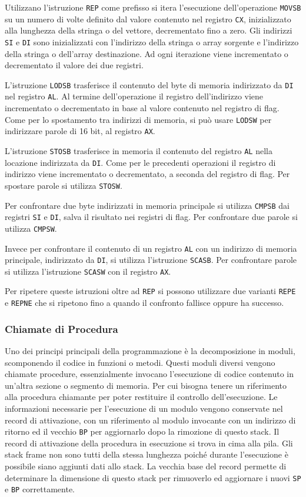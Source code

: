 \documentclass{article}
\numberwithin{equation}{subsection}
\begin{document}
Utilizzano l'istruzione \verb|REP| come prefisso si itera l'esecuzione dell'operazione \verb|MOVSB| su un numero di volte definito dal valore contenuto 
nel registro \verb|CX|, inizializzato alla lunghezza della stringa o del vettore, decrementato fino a zero. Gli indirizzi \verb|SI| e \verb|DI| sono 
inizializzati con l'indirizzo della stringa o array sorgente e l'indirizzo della stringa o dell'array destinazione. Ad ogni iterazione viene incrementato 
o decrementato il valore dei due registri. 


L'istruzione \verb|LODSB| trasferisce il contenuto del byte di memoria indirizzato da \verb|DI| nel registro \verb|AL|. Al termine dell'operazione il 
registro dell'indirizzo viene incrementato o decrementato in base al valore contenuto nel registro di flag. 
Come per lo spostamento tra indirizzi di memoria, si può usare \verb|LODSW| per indirizzare parole di 16 bit, al registro \verb|AX|. 

L'istruzione \verb|STOSB| trasferisce in memoria il contenuto del registro \verb|AL| nella locazione indirizzata da \verb|DI|. Come per le precedenti 
operazioni il registro di indirizzo viene incrementato o decrementato, a seconda del registro di flag. Per spostare parole si utilizza \verb|STOSW|. 

Per confrontare due byte indirizzati in memoria principale si utilizza \verb|CMPSB| dai registri \verb|SI| e \verb|DI|, salva il risultato nei 
registri di flag. Per confrontare due parole si utilizza \verb|CMPSW|. 

Invece per confrontare il contenuto di un registro \verb|AL| con un indirizzo di memoria principale, indirizzato da \verb|DI|, si utilizza 
l'istruzione \verb|SCASB|. Per confrontare parole si utilizza l'istruzione \verb|SCASW| con il registro \verb|AX|. 

Per ripetere queste istruzioni oltre ad \verb|REP| si possono utilizzare due varianti \verb|REPE| e \verb|REPNE| che si ripetono fino a quando 
il confronto fallisce oppure ha successo. 

\subsubsection{Chiamate di Procedura}

Uno dei principi principali della programmazione è la decomposizione in moduli, scomponendo il codice in funzioni o metodi. Questi moduli diversi vengono chiamate procedure, 
essenzialmente invocano l'esecuzione di codice contenuto in un'altra sezione o segmento di memoria. Per cui bisogna tenere un riferimento alla procedura chiamante per 
poter restituire il controllo dell'esecuzione. Le informazioni necessarie per l'esecuzione di un modulo vengono conservate nel record di attivazione, con un riferimento al 
modulo invocante con un indirizzo di ritorno ed il vecchio \verb|BP| per aggiornarlo dopo la rimozione di questo stack. Il record di attivazione della procedura in esecuzione si 
trova in cima alla pila. Gli stack frame non sono tutti della stessa lunghezza poiché durante l'esecuzione è possibile siano aggiunti 
dati allo stack. La vecchia base del record permette di determinare la dimensione di questo stack per rimuoverlo ed aggiornare i nuovi \verb|SP| e \verb|BP| correttamente. 
\end{document}
